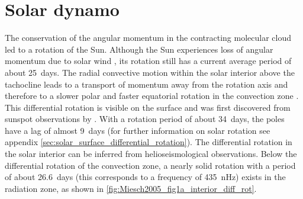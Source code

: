 \section{Solar dynamo}
\label{sec:solar_dynamo}
The conservation of the angular momentum in the contracting molecular cloud led to a rotation of the Sun. Although the Sun experiences loss of angular momentum due to solar wind \citep{Weber1967}, its rotation still has a current average period of about 25~days. The radial convective motion within the solar interior above the tachocline leads to a transport of momentum away from the rotation axis and therefore to a slower polar and faster equatorial rotation in the convection zone \citep{Miesch2005}. This differential rotation is visible on the surface and was first discovered from sunspot observations by \citet{Scheiner1630}. With a rotation period of about 34~days, the poles have a lag of almost 9~days (for further information on solar rotation see appendix \autoref{sec:solar_surface_differential_rotation}). The differential rotation in the solar interior can be inferred from helioseismological observations. Below the differential rotation of the convection zone, a nearly solid rotation with a period of about \SI{26.6}{days} (this corresponds to a frequency of \SI{435}{\nano\hertz}) exists in the radiation zone, as shown in \autoref{fig:Miesch2005_fig1a_interior_diff_rot}.
